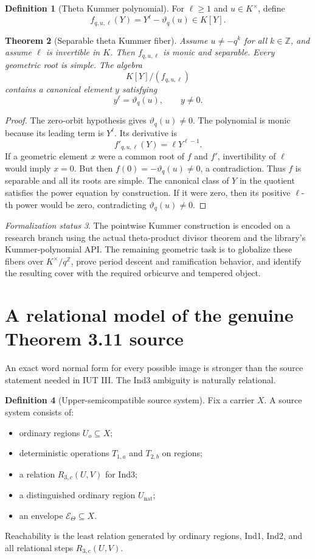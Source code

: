 \documentclass[11pt]{amsart}
\newtheorem{theorem}{Theorem}[section]
\theoremstyle{definition}
\newtheorem{definition}[theorem]{Definition}
\theoremstyle{remark}
\newtheorem{status}[theorem]{Formalization status}
\newcommand{\Z}{\mathbb Z}
\newcommand{\ThetaEnv}{\mathcal E_{\Theta}}
\newcommand{\thetaK}{\vartheta}
\begin{document}
\begin{definition}[Theta Kummer polynomial]
For $\ell\ge1$ and $u\in K^\times$, define
\[
 f_{q,u,\ell}(Y)=Y^\ell-\thetaK_q(u)\in K[Y].
\]
\end{definition}

\begin{theorem}[Separable theta Kummer fiber]\label{thm:kummer-fiber}
Assume $u\ne-q^k$ for all $k\in\Z$, and assume $\ell$ is invertible in $K$.
Then $f_{q,u,\ell}$ is monic and separable.  Every geometric root is simple.
The algebra
\[
 K[Y]/(f_{q,u,\ell})
\]
contains a canonical element $y$ satisfying
\[
 y^\ell=\thetaK_q(u),
 \qquad y\ne0.
\]
\end{theorem}

\begin{proof}
The zero-orbit hypothesis gives $\thetaK_q(u)\ne0$.  The polynomial is monic
because its leading term is $Y^\ell$.  Its derivative is
\[
 f'_{q,u,\ell}(Y)=\ell Y^{\ell-1}.
\]
If a geometric element $x$ were a common root of $f$ and $f'$, invertibility
of $\ell$ would imply $x=0$.  But then
$f(0)=-\thetaK_q(u)\ne0$, a contradiction.  Thus $f$ is separable and all its
roots are simple.  The canonical class of $Y$ in the quotient satisfies the
power equation by construction.  If it were zero, then its positive
$\ell$-th power would be zero, contradicting
$\thetaK_q(u)\ne0$.
\end{proof}

\begin{status}
The pointwise Kummer construction is encoded on a research branch using the
actual theta-product divisor theorem and the library's Kummer-polynomial API.
The remaining geometric task is to globalize these fibers over
$K^\times/q^{\Z}$, prove period descent and ramification behavior, and identify
the resulting cover with the required orbicurve and tempered object.
\end{status}

\section{A relational model of the genuine Theorem 3.11 source}

An exact word normal form for every possible image is stronger than the source
statement needed in IUT III.  The Ind3 ambiguity is naturally relational.

\begin{definition}[Upper-semicompatible source system]
Fix a carrier $X$.  A source system consists of:
\begin{itemize}
\item ordinary regions $U_o\subseteq X$;
\item deterministic operations $T_{1,a}$ and $T_{2,b}$ on regions;
\item a relation $R_{3,c}(U,V)$ for Ind3;
\item a distinguished ordinary region $U_{\mathrm{nat}}$;
\item an envelope $\ThetaEnv\subseteq X$.
\end{itemize}
Reachability is the least relation generated by ordinary regions, Ind1,
Ind2, and all relational steps $R_{3,c}(U,V)$.
\end{definition}
\end{document}
